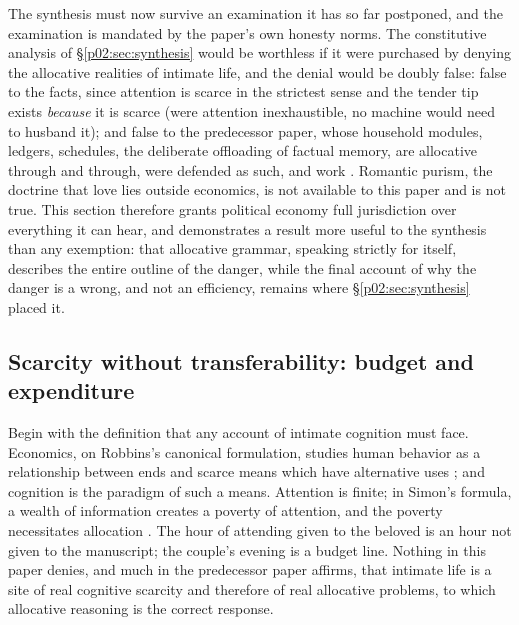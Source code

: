 The synthesis must now survive an examination it has so far postponed, and the examination is mandated by the paper's own honesty norms. The constitutive analysis of \S\ref{p02:sec:synthesis} would be worthless if it were purchased by denying the allocative realities of intimate life, and the denial would be doubly false: false to the facts, since attention is scarce in the strictest sense and the tender tip exists \emph{because} it is scarce (were attention inexhaustible, no machine would need to husband it); and false to the predecessor paper, whose household modules, ledgers, schedules, the deliberate offloading of factual memory, are allocative through and through, were defended as such, and work \parencite{huang2025toward}. Romantic purism, the doctrine that love lies outside economics, is not available to this paper and is not true. This section therefore grants political economy full jurisdiction over everything it can hear, and demonstrates a result more useful to the synthesis than any exemption: that allocative grammar, speaking strictly for itself, describes the entire outline of the danger, while the final account of why the danger is a wrong, and not an efficiency, remains where \S\ref{p02:sec:synthesis} placed it.

\subsection{Scarcity without transferability: budget and expenditure}
\label{p02:sec:pe-budget}

Begin with the definition that any account of intimate cognition must face. Economics, on Robbins's canonical formulation, studies human behavior as a relationship between ends and scarce means which have alternative uses \parencite{robbins1932essay}; and cognition is the paradigm of such a means. Attention is finite; in Simon's formula, a wealth of information creates a poverty of attention, and the poverty necessitates allocation \parencite{simon1971designing}. The hour of attending given to the beloved is an hour not given to the manuscript; the couple's evening is a budget line. Nothing in this paper denies, and much in the predecessor paper affirms, that intimate life is a site of real cognitive scarcity and therefore of real allocative problems, to which allocative reasoning is the correct response.

